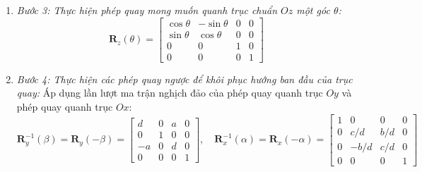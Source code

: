 \begin{enumerate}
\begin{itemize}
        Sau bước này, vector $\mathbf{u}$ biến thành vector $\mathbf{u}'' = (a, 0, d)$ nằm trọn vẹn trong mặt phẳng $Oxz$.
        \item \textit{Bước 2b: Quay quanh trục $Oy$ một góc $-\beta$ để đưa vector $\mathbf{u}''$ trùng khít hoàn toàn với trục $Oz$:} Vector $\mathbf{u}''$ hợp với trục $Oz$ một góc $\beta$ thỏa mãn $\cos\beta = d$ và $\sin\beta = -a$. Phép quay quanh trục $Oy$ được xác lập bởi ma trận:
        \begin{equation}
        \label{eq:ry_beta}
        \mathbf{R}_y(\beta) = \begin{bmatrix} d & 0 & -a & 0 \\ 0 & 1 & 0 & 0 \\ a & 0 & d & 0 \\ 0 & 0 & 0 & 1 \end{bmatrix}
        \end{equation}
    \end{itemize}
    \item \textit{Bước 3: Thực hiện phép quay mong muốn quanh trục chuẩn $Oz$ một góc $\theta$:}
    \begin{equation}
    \mathbf{R}_z(\theta) = \begin{bmatrix} \cos\theta & -\sin\theta & 0 & 0 \\ \sin\theta & \cos\theta & 0 & 0 \\ 0 & 0 & 1 & 0 \\ 0 & 0 & 0 & 1 \end{bmatrix}
    \end{equation}
    \item \textit{Bước 4: Thực hiện các phép quay ngược để khôi phục hướng ban đầu của trục quay:} Áp dụng lần lượt ma trận nghịch đảo của phép quay quanh trục $Oy$ và phép quay quanh trục $Ox$:
    \begin{equation}
    \mathbf{R}_y^{-1}(\beta) = \mathbf{R}_y(-\beta) = \begin{bmatrix} d & 0 & a & 0 \\ 0 & 1 & 0 & 0 \\ -a & 0 & d & 0 \\ 0 & 0 & 0 & 1 \end{bmatrix}, \quad \mathbf{R}_x^{-1}(\alpha) = \mathbf{R}_x(-\alpha) = \begin{bmatrix} 1 & 0 & 0 & 0 \\ 0 & c/d & b/d & 0 \\ 0 & -b/d & c/d & 0 \\ 0 & 0 & 0 & 1 \end{bmatrix}

\end{equation}
\end{enumerate}

